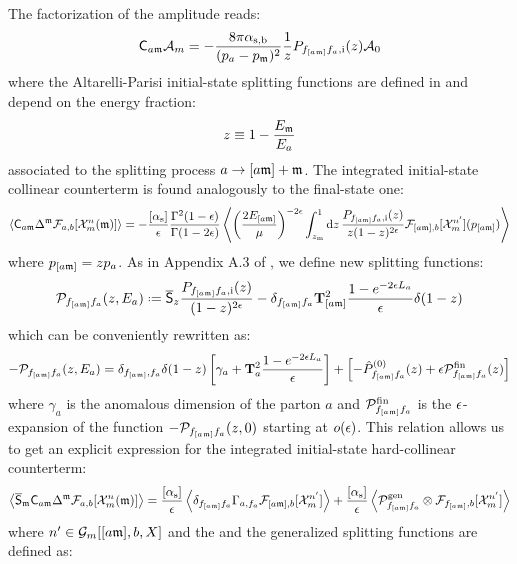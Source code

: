 The factorization of the amplitude reads:
\begin{equation}
\mathsf{C}_{a\mathfrak{m}} \mathcal{A}_m = - \frac{8\pi \alpha_\text{s,b}}{(p_a - p_{\mathfrak{m}})^2} \frac{1}{z} P_{f_{[a\mathfrak{m}]}f_a , \text{i}}(z) \mathcal{A}_0
\end{equation}
where the Altarelli-Parisi initial-state splitting functions are defined in  and depend on the energy fraction:
\begin{equation}
  z \equiv 1 - \frac{E_{\mathfrak{m}}}{E_a}
\end{equation}
associated to the splitting process $ a \rightarrow [a\mathfrak{m}] + \mathfrak{m} $. The integrated initial-state collinear counterterm is found analogously to the final-state one:
\begin{equation*}
  \left\langle \mathsf{C}_{a\mathfrak{m}} \Delta^{\mathfrak{m}} \mathcal{F}_{a,b}[\mathcal{X}^{n}_{m}(\mathfrak{m})] \right\rangle = - \frac{[\alpha_\text{s}]}{\epsilon} \frac{\Gamma^2(1-\epsilon)}{\Gamma(1-2\epsilon)} \left\langle \left( \frac{2E_{[a\mathfrak{m}]}}{\mu} \right)^{-2\epsilon} \int_{z_\text{m}}^1 \mathrm{d} z\, \frac{P_{f_{[a\mathfrak{m}]} f_a , \text{i}}(z)}{z (1-z)^{2\epsilon}} \mathcal{F}_{[a\mathfrak{m}],b}[\mathcal{X}^{n'}_{m}](p_{[a\mathfrak{m}]}) \right\rangle
\end{equation*}
where $ p_{[a\mathfrak{m}]} = z p_a $. As in Appendix A.3 of \cite{rontsch-2503}, we define new splitting functions:
\begin{equation}
  \nspl_{f_{[a\ur]}f_a}(z, E_a) \defeq \oso_z \frac{P_{f_{[a\ur]}f_a , \text{i}}(z)}{(1-z)^{2\de}} - \delta_{f_{[a\ur]}f_a} \tco_{[a\ur]}^2 \frac{1 - e^{-2\de \leg_a}}{\de} \delta(1-z)
\end{equation}
which can be conveniently rewritten as:
\begin{equation}
  - \mathcal{P}_{f_{[a\mathfrak{m}]} f_a}(z, E_a) = \delta_{f_{[a\mathfrak{m}]} , f_a} \delta(1-z) \left[ \gamma_a + \mathbf{T}_a^2 \frac{1 - e^{-2\epsilon L_a}}{\epsilon} \right] + \left[ - \hat{P}^{(0)}_{f_{[a\mathfrak{m}]} f_a}(z) + \epsilon \mathcal{P}^\text{fin}_{f_{[a\mathfrak{m}]} f_a}(z) \right]
\end{equation}
where $ \gamma_a $ is the anomalous dimension of the parton $ a $ and $ \mathcal{P}^\text{fin}_{f_{[a\mathfrak{m}]} f_a} $ is the $ \epsilon $-expansion of the function $ - \mathcal{P}_{f_{[a\mathfrak{m}]} f_a}(z, 0) $ starting at $ o(\epsilon) $. This relation allows us to get an explicit expression for the integrated initial-state hard-collinear counterterm:
\begin{equation}
  \left\langle \overline{\mathsf{S}}_{\mathfrak{m}} \mathsf{C}_{a\mathfrak{m}} \Delta^{\mathfrak{m}} \mathcal{F}_{a,b}[\mathcal{X}^{n}_{m}(\mathfrak{m})] \right\rangle = \frac{[\alpha_\text{s}]}{\epsilon} \left\langle \delta_{f_{[a\mathfrak{m}]}f_a} \Gamma_{a,f_a} \mathcal{F}_{[a\mathfrak{m}],b}[\mathcal{X}^{n'}_{m}] \right\rangle + \frac{[\alpha_\text{s}]}{\epsilon} \left\langle \mathcal{P}^\text{gen}_{f_{[a\mathfrak{m}]}f_a} \otimes \mathcal{F}_{f_{[a\mathfrak{m}]},b}[\mathcal{X}^{n'}_{m}] \right\rangle
  \label{eq:hc-is}
\end{equation}
where $ n' \in \mathcal{G}_m[[a\mathfrak{m}],b,X] $ and the  and the generalized splitting functions are defined as:
